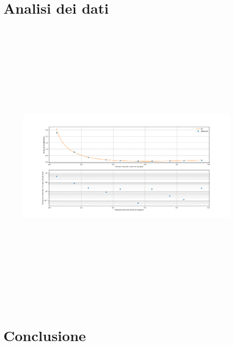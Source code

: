 \documentclass[11pt]{article}
\begin{document}
\section{Analisi dei dati}
\begin{figure}[htbp]
\centerline{\includegraphics[width=20cm, height=15cm]{physicalpendulum_plots_1.0.png}}

\label{fig}
\end{figure}

\section{Conclusione}
\end{document}
